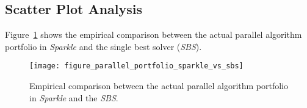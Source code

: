 \documentclass[british]{article}
\begin{document}
\subsection{Scatter Plot Analysis}
\label{sec:Scatter_Plot_Analysis}

Figure~\ref{fig:sparkle_vs_sbs} shows the empirical comparison between the actual parallel algorithm portfolio in \emph{Sparkle} and the single best solver (\emph{SBS}).

\begin{figure}[htbp]
\noindent \begin{centering}
    \texttt{[image: figure\_parallel\_portfolio\_sparkle\_vs\_sbs]}
\par\end{centering}

\caption{Empirical comparison between the actual parallel algorithm portfolio in \emph{Sparkle} and the \emph{SBS}.}\label{fig:sparkle_vs_sbs}
\end{figure}



\end{document}
